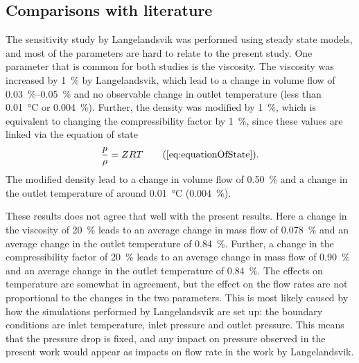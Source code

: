 

\subsection{Comparisons with literature}
The sensitivity study by Langelandsvik \cite{Langelandsvik2008Modeling} was performed using steady state models, and most of the parameters are hard to relate to the present study. One parameter that is common for both studies is the viscosity. The viscosity was increased by \SI{1}{\percent} by Langelandsvik, which lead to a change in volume flow of \SIrange{0.03}{0.05}{\percent} and no observable change in outlet temperature (less than \SI{0.01}{\celsius} or \SI{0.004}{\percent}). Further, the density was modified by \SI{1}{\percent}, which is equivalent to changing the compressibility factor by \SI{1}{\percent}, since these values are linked via the equation of state
\begin{align}
    \frac{p}{\rho} = ZRT \tag{\ref{eq:equationOfState}}
.
\end{align}
The modified density lead to a change in volume flow of \SI{0.50}{\percent} and a change in the outlet temperature of around \SI{0.01}{\celsius} (\SI{0.004}{\percent}). 

These results does not agree that well with the present results. Here a change in the viscosity of \SI{20}{\percent} leads to an average change in mass flow of \SI{0.078}{\percent} and an average change in the outlet temperature of \SI{0.84}{\percent}. Further, a change in the compressibility factor of \SI{20}{\percent} leads to an average change in mass flow of \SI{0.90}{\percent} and an average change in the outlet temperature of \SI{0.84}{\percent}. The effects on temperature are somewhat in agreement, but the effect on the flow rates are not proportional to the changes in the two parameters. This is most likely caused by how the simulations performed by Langelandsvik are set up: the boundary conditions are inlet temperature, inlet pressure and outlet pressure. This means that the pressure drop is fixed, and any impact on pressure observed in the present work would appear as impacts on flow rate in the work by Langelandsvik. 

